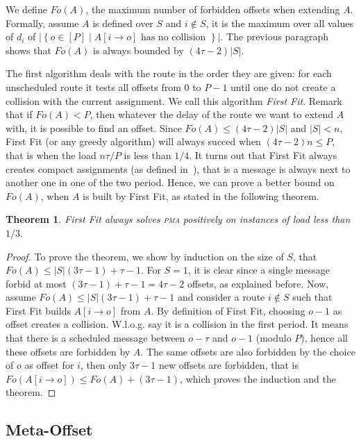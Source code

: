 \documentclass[10pt, conference, letterpaper]{IEEEtran}
\newtheorem{theorem}{Theorem}
\newcommand\pma{\textsc{pma}\xspace}
\begin{document}
We define $Fo(A)$, the maximum number of forbidden offsets when 
extending $A$. Formally, assume $A$ is defined over $S$ and $i\notin S$, 
it is the maximum over all values of $d_i$ of $|\left\{ o \in [P] \mid A[i \rightarrow o] \text{ has no collision }\right\}|$. The previous paragraph shows that $Fo(A)$ is always bounded by $(4 \tau -2)|S|$. 

The first algorithm deals with the route in the order they are given:  for each unscheduled route it tests all offsets from $0$ to $P-1$ until one do not create a collision with the current assignment.
We call this algorithm \emph{First Fit}. Remark that if $Fo(A) < P$, then whatever the delay of the route we want to extend $A$ with, it is possible to find an offset. Since $Fo(A) \leq (4 \tau -2)|S|$ and $|S| < n$, First Fit (or any greedy algorithm) will always succed when $(4 \tau -2)n \leq P$, that is when the load $ n\tau /P$ is less than $1/4$.
It turns out that First Fit always creates compact assignments (as defined in~\cite{dominique2018deterministic}), that is a message is always next to another one in one of the two period. Hence, we can prove a better bound on $Fo(A)$, when $A$ is built by First Fit, as stated in the following theorem.

\begin{theorem}
First Fit always solves \pma positively on instances of load less than $1/3$. 
\end{theorem}
\begin{proof}
To prove the theorem, we show by induction on the size of $S$, that $Fo(A) \leq |S|(3\tau -1) + \tau -1$.  For $S = 1$, it is clear since a single message forbid at most $(3\tau -1) + \tau -1 = 4\tau-2$ offsets, as explained before. Now, assume $Fo(A) \leq |S|(3\tau -1) + \tau -1$ and consider a route $i \notin S$ such that First Fit builds $A[i \rightarrow o]$ from $A$. By definition of First Fit, choosing $o-1$ as offset creates a collision. W.l.o.g. say it is a collision in the first period. It means that there is a scheduled message between $o - \tau $ and $o-1$ (modulo $P$), hence all these offsets are forbidden by $A$. The same offsets are also forbidden by the choice of $o$ as offset for $i$, then only $3\tau -1$ new offsets are forbidden, that is $Fo(A[i \rightarrow o]) \leq Fo(A) + (3\tau -1)$,
which proves the induction and the theorem.
\end{proof}


\subsection{Meta-Offset}
\end{document}
